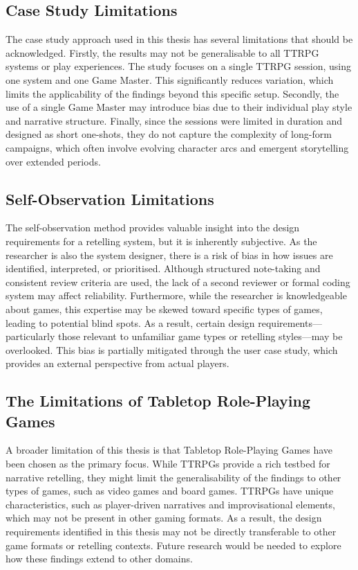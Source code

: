 \subsection*{Case Study Limitations}
The case study approach used in this thesis has several limitations that should be acknowledged. Firstly, the results may not be generalisable to all TTRPG systems or play experiences. The study focuses on a single TTRPG session, using one system and one Game Master. This significantly reduces variation, which limits the applicability of the findings beyond this specific setup. Secondly, the use of a single Game Master may introduce bias due to their individual play style and narrative structure. Finally, since the sessions were limited in duration and designed as short one-shots, they do not capture the complexity of long-form campaigns, which often involve evolving character arcs and emergent storytelling over extended periods.

\subsection*{Self-Observation Limitations}
The self-observation method provides valuable insight into the design requirements for a retelling system, but it is inherently subjective. As the researcher is also the system designer, there is a risk of bias in how issues are identified, interpreted, or prioritised. Although structured note-taking and consistent review criteria are used, the lack of a second reviewer or formal coding system may affect reliability. Furthermore, while the researcher is knowledgeable about games, this expertise may be skewed toward specific types of games, leading to potential blind spots. As a result, certain design requirements—particularly those relevant to unfamiliar game types or retelling styles—may be overlooked. This bias is partially mitigated through the user case study, which provides an external perspective from actual players.

\subsection*{The Limitations of Tabletop Role-Playing Games}
A broader limitation of this thesis is that Tabletop Role-Playing Games have been chosen as the primary focus. While TTRPGs provide a rich testbed for narrative retelling, they might limit the generalisability of the findings to other types of games, such as video games and board games. TTRPGs have unique characteristics, such as player-driven narratives and improvisational elements, which may not be present in other gaming formats. As a result, the design requirements identified in this thesis may not be directly transferable to other game formats or retelling contexts. Future research would be needed to explore how these findings extend to other domains.

